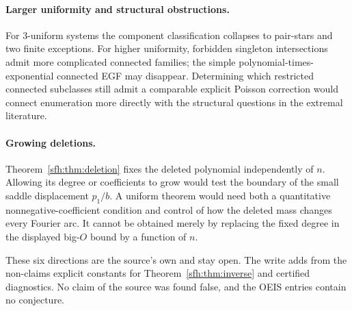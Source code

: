 \paragraph{Larger uniformity and structural obstructions.}
For $3$-uniform systems the component classification collapses to pair-stars and two finite exceptions. For higher uniformity, forbidden singleton intersections admit more complicated connected families; the simple polynomial-times-exponential connected EGF may disappear. Determining which restricted connected subclasses still admit a comparable explicit Poisson correction would connect enumeration more directly with the structural questions in the extremal literature.

\paragraph{Growing deletions.}
Theorem~\ref{sfh:thm:deletion} fixes the deleted polynomial independently of $n$. Allowing its degree or coefficients to grow would test the boundary of the small saddle displacement $p_1/b$. A uniform theorem would need both a quantitative nonnegative-coefficient condition and control of how the deleted mass changes every Fourier arc. It cannot be obtained merely by replacing the fixed degree in the displayed big-$O$ bound by a function of $n$.
\begin{writenote}
These six directions are the source's own and stay open. The write adds from
the non-claims explicit constants for Theorem~\ref{sfh:thm:inverse} and
certified diagnostics. No claim of the source was found false, and the OEIS
entries contain no conjecture.
\end{writenote}
